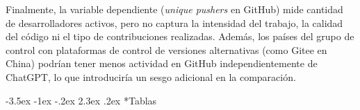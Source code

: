 \documentclass[12pt,a4paper]{article}
\makeatletter
\renewcommand\section{\@startsection{section}{1}{\z@}%
  {-3.5ex \@plus -1ex \@minus -.2ex}%
  {2.3ex \@plus.2ex}%
  {\normalfont\normalsize}}
\makeatother
\begin{document}
Finalmente, la variable dependiente (\textit{unique pushers} en GitHub) mide cantidad de desarrolladores activos, pero no captura la intensidad del trabajo, la calidad del código ni el tipo de contribuciones realizadas. Además, los países del grupo de control con plataformas de control de versiones alternativas (como Gitee en China) podrían tener menos actividad en GitHub independientemente de ChatGPT, lo que introduciría un sesgo adicional en la comparación.

\clearpage
{}
{}
\section*{\centering\normalfont Tablas}

\end{document}
